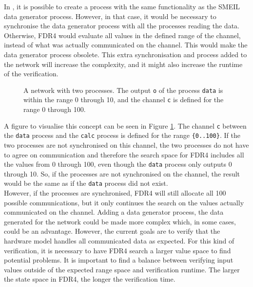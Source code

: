 In \cspm{}, it is possible to create a process with the same functionality as the SMEIL data generator process. However, in that case, it would be necessary to synchronise the data generator process with all the processes reading the data. Otherwise, FDR4 would evaluate all values in the defined range of the channel, instead of what was actually communicated on the channel. This would make the data generator process obsolete. This extra synchronisation and process added to the \cspm{} network will increase the complexity, and it might also increase the runtime of the verification.
\begin{figure}
    \centering
    \caption{A \cspm{} network with two processes. The output \texttt{o} of the process \texttt{data} is within the range 0 through 10, and the channel \texttt{c} is defined for the range 0 through 100.}
    \label{fig:csp_data_generator_process}
\end{figure}
A figure to visualise this concept can be seen in Figure \ref{fig:csp_data_generator_process}. The channel \texttt{c} between the \texttt{data} process and the \texttt{calc} process is defined for the range \texttt{\{0..100\}}. If the two processes are not synchronised on this channel, the two processes do not have to agree on communication and therefore the search space for FDR4 includes all the values from 0 through 100, even though the \texttt{data} process only outputs 0 through 10. So, if the processes are not synchronised on the channel, the result would be the same as if the \texttt{data} process did not exist. \\

However, if the processes are synchronised, FDR4 will still allocate all 100 possible communications, but it only continues the search on the values actually communicated on the channel.
Adding a data generator process, the data generated for the network could be made more complex which, in some cases, could be an advantage. However, the current goals are to verify that the hardware model handles all communicated data as expected. For this kind of verification, it is necessary to have FDR4 search a larger value space to find potential problems. It is important to find a balance between verifying input values outside of the expected range space and verification runtime. The larger the state space in FDR4, the longer the verification time.

